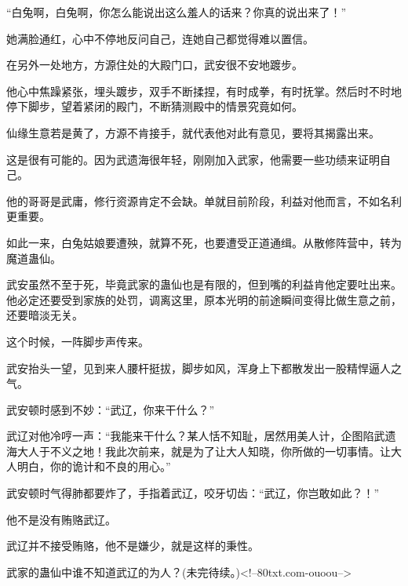 \begin{this_body}
“白兔啊，白兔啊，你怎么能说出这么羞人的话来？你真的说出来了！”

她满脸通红，心中不停地反问自己，连她自己都觉得难以置信。

在另外一处地方，方源住处的大殿门口，武安很不安地踱步。

他心中焦躁紧张，埋头踱步，双手不断揉捏，有时成拳，有时抚掌。然后时不时地停下脚步，望着紧闭的殿门，不断猜测殿中的情景究竟如何。

仙缘生意若是黄了，方源不肯接手，就代表他对此有意见，要将其揭露出来。

这是很有可能的。因为武遗海很年轻，刚刚加入武家，他需要一些功绩来证明自己。

他的哥哥是武庸，修行资源肯定不会缺。单就目前阶段，利益对他而言，不如名利更重要。

如此一来，白兔姑娘要遭殃，就算不死，也要遭受正道通缉。从散修阵营中，转为魔道蛊仙。

武安虽然不至于死，毕竟武家的蛊仙也是有限的，但到嘴的利益肯他定要吐出来。他必定还要受到家族的处罚，调离这里，原本光明的前途瞬间变得比做生意之前，还要暗淡无关。

这个时候，一阵脚步声传来。

武安抬头一望，见到来人腰杆挺拔，脚步如风，浑身上下都散发出一股精悍逼人之气。

武安顿时感到不妙：“武辽，你来干什么？”

武辽对他冷哼一声：“我能来干什么？某人恬不知耻，居然用美人计，企图陷武遗海大人于不义之地！我此次前来，就是为了让大人知晓，你所做的一切事情。让大人明白，你的诡计和不良的用心。”

武安顿时气得肺都要炸了，手指着武辽，咬牙切齿：“武辽，你岂敢如此？！”

他不是没有贿赂武辽。

武辽并不接受贿赂，他不是嫌少，就是这样的秉性。

武家的蛊仙中谁不知道武辽的为人？(未完待续。)<!--80txt.com-ouoou-->

\end{this_body}

